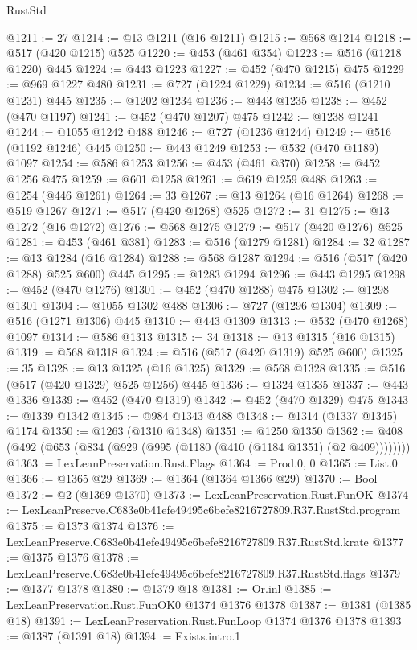 \begin{lexlean}{RustStd}
\begin{coremodule}
@1211 := 27
@1214 := @13 @1211 (@16 @1211)
@1215 := @568 @1214
@1218 := @517 (@420 @1215) @525
@1220 := @453 (@461 @354)
@1223 := @516 (@1218 @1220) @445
@1224 := @443 @1223
@1227 := @452 (@470 @1215) @475
@1229 := @969 @1227 @480
@1231 := @727 (@1224 @1229)
@1234 := @516 (@1210 @1231) @445
@1235 := @1202 @1234
@1236 := @443 @1235
@1238 := @452 (@470 @1197)
@1241 := @452 (@470 @1207) @475
@1242 := @1238 @1241
@1244 := @1055 @1242 @488
@1246 := @727 (@1236 @1244)
@1249 := @516 (@1192 @1246) @445
@1250 := @443 @1249
@1253 := @532 (@470 @1189) @1097
@1254 := @586 @1253
@1256 := @453 (@461 @370)
@1258 := @452 @1256 @475
@1259 := @601 @1258
@1261 := @619 @1259 @488
@1263 := @1254 (@446 @1261)
@1264 := 33
@1267 := @13 @1264 (@16 @1264)
@1268 := @519 @1267
@1271 := @517 (@420 @1268) @525
@1272 := 31
@1275 := @13 @1272 (@16 @1272)
@1276 := @568 @1275
@1279 := @517 (@420 @1276) @525
@1281 := @453 (@461 @381)
@1283 := @516 (@1279 @1281)
@1284 := 32
@1287 := @13 @1284 (@16 @1284)
@1288 := @568 @1287
@1294 := @516 (@517 (@420 @1288) @525 @600) @445
@1295 := @1283 @1294
@1296 := @443 @1295
@1298 := @452 (@470 @1276)
@1301 := @452 (@470 @1288) @475
@1302 := @1298 @1301
@1304 := @1055 @1302 @488
@1306 := @727 (@1296 @1304)
@1309 := @516 (@1271 @1306) @445
@1310 := @443 @1309
@1313 := @532 (@470 @1268) @1097
@1314 := @586 @1313
@1315 := 34
@1318 := @13 @1315 (@16 @1315)
@1319 := @568 @1318
@1324 := @516 (@517 (@420 @1319) @525 @600)
@1325 := 35
@1328 := @13 @1325 (@16 @1325)
@1329 := @568 @1328
@1335 := @516 (@517 (@420 @1329) @525 @1256) @445
@1336 := @1324 @1335
@1337 := @443 @1336
@1339 := @452 (@470 @1319)
@1342 := @452 (@470 @1329) @475
@1343 := @1339 @1342
@1345 := @984 @1343 @488
@1348 := @1314 (@1337 @1345) @1174
@1350 := @1263 (@1310 @1348)
@1351 := @1250 @1350
@1362 := @408 (@492 (@653 (@834 (@929 (@995 (@1180 (@410 (@1184 @1351) (@2 @409))))))))
@1363 := LexLeanPreservation.Rust.Flags
@1364 := Prod.{0, 0}
@1365 := List.{0}
@1366 := @1365 @29
@1369 := @1364 (@1364 @1366 @29)
@1370 := Bool
@1372 := @2 (@1369 @1370)
@1373 := LexLeanPreservation.Rust.FunOK
@1374 := LexLeanPreserve.C683e0b41efe49495c6befe8216727809.R37.RustStd.program
@1375 := @1373 @1374
@1376 := LexLeanPreserve.C683e0b41efe49495c6befe8216727809.R37.RustStd.krate
@1377 := @1375 @1376
@1378 := LexLeanPreserve.C683e0b41efe49495c6befe8216727809.R37.RustStd.flags
@1379 := @1377 @1378
@1380 := @1379 @18
@1381 := Or.inl
@1385 := LexLeanPreservation.Rust.FunOK0 @1374 @1376 @1378
@1387 := @1381 (@1385 @18)
@1391 := LexLeanPreservation.Rust.FunLoop @1374 @1376 @1378
@1393 := @1387 (@1391 @18)
@1394 := Exists.intro.{1}

\end{coremodule}
\end{lexlean}
